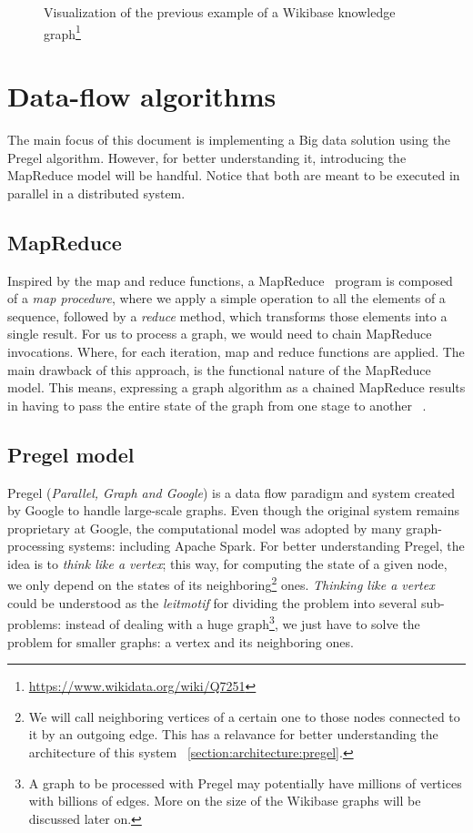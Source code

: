 \begin{figure}[h]
    \centering
    
    \caption[Visualization of an example of a Wikibase knowledge graph]{Visualization of the previous example of a Wikibase knowledge graph\footnote{\url{https://www.wikidata.org/wiki/Q7251}}}
    \label{fig:wikibase:graph}
\end{figure}

\section{Data-flow algorithms}

The main focus of this document is implementing a Big data solution using the Pregel algorithm. However, for better understanding it, introducing the MapReduce model will be handful. Notice that both are meant to be executed in parallel in a distributed system.

\subsection{MapReduce}

Inspired by the map and reduce functions, a MapReduce~\cite{wiki:MapReduce} program is composed of a \textit{map procedure}, where we apply a simple operation to all the elements of a sequence, followed by a \textit{reduce} method, which transforms those elements into a single result. For us to process a graph, we would need to chain MapReduce invocations. Where, for each iteration, map and reduce functions are applied. The main drawback of this approach, is the functional nature of the MapReduce model. This means, expressing a graph algorithm as a chained MapReduce results in having to pass the entire state of the graph from one stage to another~\cite{10.1145/1807167.1807184} .

\subsection{Pregel model}

Pregel (\textit{Parallel, Graph and Google}) is a data flow paradigm and system created by Google to handle large-scale graphs. Even though the original system remains proprietary at Google, the computational model was adopted by many graph-processing systems: including Apache Spark. For better understanding Pregel, the idea is to \textit{think like a vertex}; this way, for computing the state of a given node, we only depend on the states of its neighboring\footnote{We will call neighboring vertices of a certain one to those nodes connected to it by an outgoing edge. This has a relavance for better understanding the architecture of this system ~\ref{section:architecture:pregel}.} ones. \textit{Thinking like a vertex} could be understood as the \textit{leitmotif} for dividing the problem into several sub-problems: instead of dealing with a huge graph\footnote{A graph to be processed with Pregel may potentially have millions of vertices with billions of edges. More on the size of the Wikibase graphs will be discussed later on.}, we just have to solve the problem for smaller graphs: a vertex and its neighboring ones.

